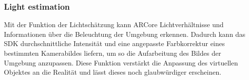 \subsubsection*{Light estimation}
Mit der Funktion der Lichtschätzung kann ARCore Lichtverhältnisse und Informationen über die Beleuchtung der Umgebung erkennen. Dadurch kann das 
\acs{SDK} durchschnittliche Intensität und eine angepasste Farbkorrektur eines bestimmten Kamerabildes liefern, um so die Aufarbeitung des Bildes 
der Umgebung anzupassen. Diese Funktion verstärkt die Anpassung des virtuellen Objektes an die Realität und lässt dieses noch glaubwürdiger 
erscheinen. \cite{arcoreofficial.2020j}
